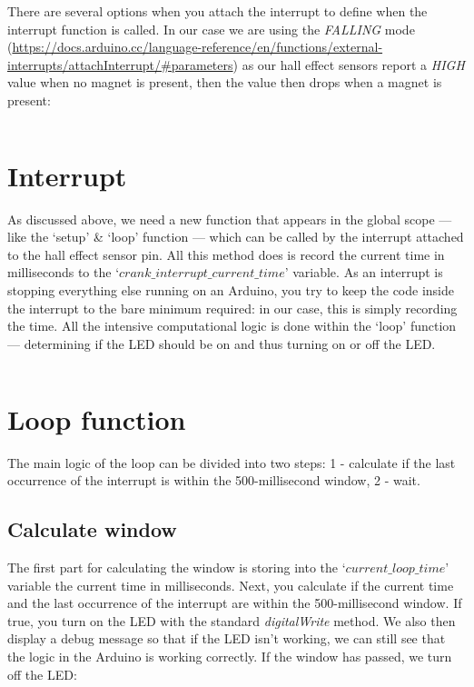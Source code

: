 \documentclass[11pt,a4paper]{article}
\begin{document}
\noindent
There are several options when you attach the interrupt to define when the interrupt function is called. In our case we are using the \textit{FALLING} mode (\url{https://docs.arduino.cc/language-reference/en/functions/external-interrupts/attachInterrupt/#parameters}) as our hall effect sensors report a \textit{HIGH} value when no magnet is present, then the value then drops when a magnet is present:\\
\vspace{-1.75em}
\inputminted{arduino}{./src/5-setup-io.txt}
\vspace{.75em}

\section{Interrupt}
As discussed above, we need a new function that appears in the global scope --- like the `setup' \& `loop' function --- which can be called by the interrupt attached to the hall effect sensor pin. All this method does is record the current time in milliseconds to the `$crank\_interrupt\_current\_time$' variable. As an interrupt is stopping everything else running on an Arduino, you try to keep the code inside the interrupt to the bare minimum required: in our case, this is simply recording the time. All the intensive computational logic is done within the `loop' function --- determining if the LED should be on and thus turning on or off the LED.\\
\vspace{-1.75em}
\inputminted{arduino}{./src/6-interrupt.txt}
\vspace{.75em}

\section{Loop function}
The main logic of the loop can be divided into two steps: 1 - calculate if the last occurrence of the interrupt is within the 500-millisecond window, 2 - wait.

\subsection{Calculate window}
The first part for calculating the window is storing into the `$current\_loop\_time$' variable the current time in milliseconds. Next, you calculate if the current time and the last occurrence of the interrupt are within the 500-millisecond window. If true, you turn on the LED with the standard \textit{digitalWrite} method. We also then display a debug message so that if the LED isn't working, we can still see that the logic in the Arduino is working correctly. If the window has passed, we turn off the LED:\\
\vspace{-1.75em}
\inputminted{arduino}{./src/7-loop-led.txt}
\vspace{.75em}
\end{document}
